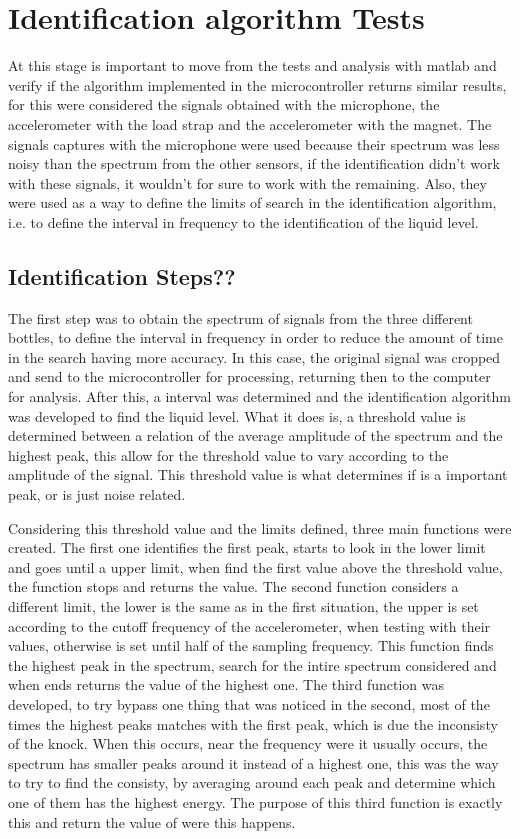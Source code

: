 \section{Identification algorithm Tests}
At this stage is important to move from the tests and analysis with \acrshort{matlab} and verify if the algorithm implemented in the microcontroller returns similar results, for this were considered the signals obtained with the microphone, the accelerometer with the load strap and the accelerometer with the magnet. The signals captures with the microphone were used because their spectrum was less noisy than the spectrum from the other sensors, if the identification didn't work with these signals, it wouldn't for sure to work with the remaining. Also, they were used as a way to define the limits of search in the identification algorithm, i.e. to define the interval in frequency to the identification of the liquid level.  
\subsection{Identification Steps??}
The first step was to obtain the spectrum of signals from the three different bottles, to define the interval in frequency in order to reduce the amount of time in the search having more accuracy. In this case, the original signal was cropped and send to the microcontroller for processing, returning then to the computer for analysis.
After this, a interval was determined and the identification algorithm was developed to find the liquid level. What it does is, a threshold value is determined between a relation of the average amplitude of the spectrum and the highest peak, this allow for the threshold value to vary according to the amplitude of the signal. This threshold value is what determines if is a important peak, or is just noise related. 

Considering this threshold value and the limits defined, three main functions were created. The first one identifies the first peak, starts to look in the lower limit and goes until a upper limit, when find the first value above the threshold value, the function stops and returns the value.
The second function considers a different limit, the lower is the same as in the first situation, the upper is set according to the cutoff frequency of the accelerometer, when testing with their values, otherwise is set until half of the sampling frequency. This function finds the highest peak in the spectrum, search for the intire spectrum considered and when ends returns the value of the highest one.
The third function was developed, to try bypass one thing that was noticed in the second, most of the times the highest peaks matches with the first peak, which is due the inconsisty of the knock. When this occurs, near the frequency were it usually occurs, the spectrum has smaller peaks around it instead of a highest one, this was the way to try to find the consisty, by averaging around each peak and determine which one of them has the highest energy. The purpose of this third function is exactly this and return the value of were this happens.

